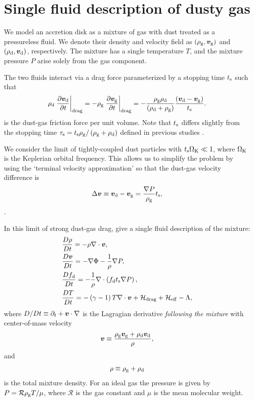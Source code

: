 \section{Single fluid description of dusty gas}\label{setup} 
We model an accretion disk as a mixture of gas with dust treated as a 
pressureless fluid. We denote their density and
velocity field as $(\rho_\mathrm{g},\bm{v}_\mathrm{g})$ and
$(\rho_\mathrm{d},\bm{v}_\mathrm{d})$, respectively. The mixture has a single 
temperature $T$, and the mixture pressure $P$ arise solely from the 
gas component.  

The two fluids interact via a drag force parameterized by a stopping
time $t_\mathrm{s}$ 
such that 
\begin{align}  
  \rho_\mathrm{d}\left.\frac{\partial \bm{v}_\mathrm{d}}{\partial t}\right|_\mathrm{drag}= -
  \rho_\mathrm{g}\left.\frac{\partial \bm{v}_\mathrm{g}}{\partial t}\right|_\mathrm{drag}=
  - \frac{\rho_\mathrm{g}\rho_\mathrm{d}}{\left(\rho_\mathrm{d}+\rho_\mathrm{g}\right)}\frac{\left(\bm{v}_\mathrm{d} -
    \bm{v}_\mathrm{g}\right)}{t_\mathrm{s}}. 
\end{align}
is the dust-gas friction force per unit volume. Note that $t_\mathrm{s}$ 
differs slightly from the stopping time $\tau_\mathrm{s} =
t_\mathrm{s}\rho_\mathrm{g}/\left(\rho_\mathrm{g}+\rho_\mathrm{d}\right)$ defined in previous studies
\citep[e.g.][]{youdin05a,jacquet11}.   

We consider the limit of tightly-coupled dust particles with 
$t_\mathrm{s}\Omega_{\rm K}\ll 1 $, where $\Omega_{\rm K}$ is the Keplerian orbital
frequency. This allows us to simplify the problem by using the
`terminal velocity approximation' so that the dust-gas velocity
difference is 
\begin{align}
  \Delta\bm{v}\equiv\bm{v}_\mathrm{d} - \bm{v}_\mathrm{g} = \frac{\nabla
    P}{\rho_\mathrm{g}}t_\mathrm{s}, 
\end{align}
\citep{youdin05a,jacquet11}. 

In this limit of strong dust-gas drag, \cite{laibe14} give a single
fluid description of the mixture: 
\begin{align}
  &\frac{D\rho}{Dt} = -\rho\nabla\cdot\bm{v}, \label{masseq}\\ 
  &\frac{D\bm{v}}{Dt} = - \nabla\Phi - \frac{1}{\rho}\nabla  P, \label{momeq}\\ 
  &\frac{Df_\mathrm{d}}{Dt} = -\frac{1}{\rho} \nabla \cdot \left(f_\mathrm{d} 
  t_\mathrm{s} \nabla P \right),\label{dusteq}\\
  &\frac{D T}{D t} = - \left(\gamma-1\right)T\nabla\cdot\bm{v} +
  \mathcal{H}_\mathrm{drag} + \mathcal{H}_\mathrm{eff}  - \Lambda, \label{tempeq} 
\end{align}
where $D/Dt \equiv \partial_t + \bm{v}\cdot\nabla$ is the Lagragian
derivative \emph{following the mixture} with center-of-mass velocity  
\begin{align}
  \bm{v} \equiv \frac{\rho_\mathrm{g}\bm{v}_\mathrm{g} + 
    \rho_\mathrm{d}\bm{v}_\mathrm{d}}{\rho}, 
\end{align}
and 
\begin{align}
  \rho \equiv \rho_\mathrm{g} + \rho_\mathrm{d}
\end{align}
is the total mixture density. For an ideal gas the pressure is given
by $P = \mathcal{R}\rho_\mathrm{g} T/\mu $, where $\mathcal{R}$ is
the gas constant and $\mu$ is the mean molecular weight. 

